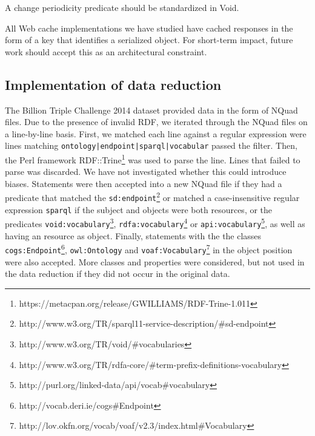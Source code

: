 \documentclass{llncs}
\newcommand{\rdfterm}[1]{\texttt{#1}}
\begin{document}
A change periodicity predicate should be standardized in Void.

All Web cache implementations we have studied have cached responses in
the form of a key that identifies a serialized object. For short-term
impact, future work should accept this as an architectural constraint.


%
%
%



\begin{subappendices}
\renewcommand{\thesection}{\Alph{section}}%

\section{Implementation of data reduction}\label{app:reduction}

The Billion Triple Challenge 2014 dataset provided data in the form of
NQuad files. Due to the presence of invalid RDF, we iterated through
the NQuad files on a line-by-line basis. First, we matched each line
against a regular expression were lines matching
\texttt{ontology|endpoint|sparql|vocabular} passed the filter. Then,
the Perl framework
RDF::Trine\footnote{https://metacpan.org/release/GWILLIAMS/RDF-Trine-1.011} was used
to parse the line. Lines that failed to parse was discarded. We have
not investigated whether this could introduce biases. Statements were
then accepted into a new NQuad file if they had a predicate that
matched the
\rdfterm{sd:endpoint}\footnote{http://www.w3.org/TR/sparql11-service-description/\#sd-endpoint}
or matched a case-insensitive regular expression \texttt{sparql} if
the subject and objects were both resources, or the predicates
\rdfterm{void:vocabulary}\footnote{http://www.w3.org/TR/void/\#vocabularies},
\rdfterm{rdfa:vocabulary}\footnote{http://www.w3.org/TR/rdfa-core/\#term-prefix-definitions-vocabulary}
or
\rdfterm{api:vocabulary}\footnote{http://purl.org/linked-data/api/vocab\#vocabulary},
as well as having an resource as object. Finally, statements with the
the classes
\rdfterm{cogs:Endpoint}\footnote{http://vocab.deri.ie/cogs\#Endpoint},
\rdfterm{owl:Ontology} and
\rdfterm{voaf:Vocabulary}\footnote{http://lov.okfn.org/vocab/voaf/v2.3/index.html\#Vocabulary}
in the object position were also accepted. More classes and properties
were considered, but not used in the data reduction if they did not
occur in the original data.


\end{subappendices}
\end{document}
